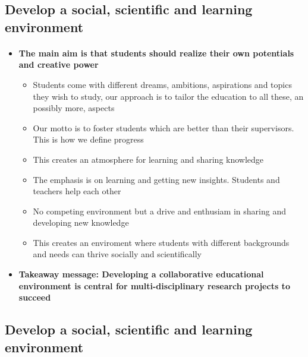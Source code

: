 \documentclass[%
twoside,                 %
final,                   %
10pt]{article}
\begin{document}
\subsection*{Develop a social, scientific and learning environment}

\paragraph{}
\begin{itemize}
\item \textbf{The main aim is that students should realize their own potentials and creative power}
\begin{itemize}

 \item Students come with different dreams, ambitions, aspirations and topics they wish to study, our approach is to tailor the education to all these, an possibly more, aspects

 \item Our motto is to foster students which are better than their supervisors. This is how we define progress

 \item This creates an atmosphere for learning and sharing knowledge

 \item The emphasis is on learning and getting new insights. Students and teachers help each other

 \item No competing environment but a drive and enthusiam in sharing and developing new knowledge

 \item This creates an enviroment where students with different backgrounds and needs can thrive socially and scientifically

\end{itemize}

\noindent
\item \textbf{Takeaway message: Developing a collaborative educational environment is central for multi-disciplinary research projects to succeed}
\end{itemize}

\noindent





\subsection*{Develop a social, scientific and learning environment}
\end{document}
